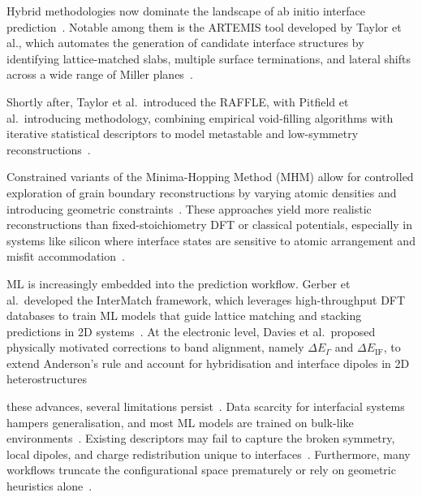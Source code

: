 

Hybrid methodologies now dominate the landscape of ab initio interface prediction~\nocite{}.
Notable among them is the ARTEMIS tool developed by Taylor et al., which automates the generation of candidate interface structures by identifying lattice-matched slabs, multiple surface terminations, and lateral shifts across a wide range of Miller planes~\cite{artemis_paper}.

Shortly after, Taylor et al.\ introduced the RAFFLE, with Pitfield et al.\ introducing methodology, combining empirical void-filling algorithms with iterative statistical descriptors to model metastable and low-symmetry reconstructions~\cite{raffle_paper}.

Constrained variants of the Minima-Hopping Method (MHM) allow for controlled exploration of grain boundary reconstructions by varying atomic densities and introducing geometric constraints~\cite{Sun2021_interface}.
These approaches yield more realistic reconstructions than fixed-stoichiometry DFT or classical potentials, especially in systems like silicon where interface states are sensitive to atomic arrangement and misfit accommodation~\nocite{}.

ML is increasingly embedded into the prediction workflow. Gerber et al.\ developed the InterMatch framework, which leverages high-throughput DFT databases to train ML models that guide lattice matching and stacking predictions in 2D systems~\cite{Gerber2023-yd}.
At the electronic level, Davies et al.\ proposed physically motivated corrections to band alignment, namely $\Delta E_\Gamma$ and $\Delta E_{\mathrm{IF}}$, to extend Anderson's rule and account for hybridisation and interface dipoles in 2D heterostructures~\cite{Davies2024-ju}

\Despite these advances, several limitations persist~\nocite{}.
Data scarcity for interfacial systems hampers generalisation, and most ML models are trained on bulk-like environments~\nocite{}.
Existing descriptors may fail to capture the broken symmetry, local dipoles, and charge redistribution unique to interfaces~\nocite{}.
Furthermore, many workflows truncate the configurational space prematurely or rely on geometric heuristics alone~\cite{Pyzer-Knapp2025-uq, Khot2025-hh, Gerber2023-yd}.


